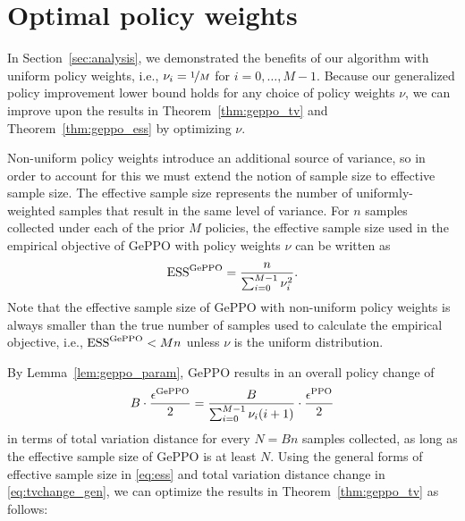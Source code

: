 \documentclass{article}
\begin{document}

\section{Optimal policy weights}\label{sec:app_weights}

In Section~\ref{sec:analysis}, we demonstrated the benefits of our algorithm with uniform policy weights, i.e., $\nu_i = \nicefrac{1}{M}$ for $i=0,\ldots,M-1$. Because our generalized policy improvement lower bound holds for any choice of policy weights $\nu$, we can improve upon the results in Theorem~\ref{thm:geppo_tv} and Theorem~\ref{thm:geppo_ess} by optimizing $\nu$.

Non-uniform policy weights introduce an additional source of variance, so in order to account for this we must extend the notion of sample size to effective sample size. The effective sample size represents the number of uniformly-weighted samples that result in the same level of variance. For $n$ samples collected under each of the prior $M$ policies, the effective sample size used in the empirical objective of GePPO with policy weights $\nu$ can be written as
\begin{equation}\label{eq:ess}
\operatorname{ESS}^\textnormal{GePPO} = \frac{n}{\sum_{i=0}^{M-1} \nu_i^2}.
\end{equation}
Note that the effective sample size of GePPO with non-uniform policy weights is always smaller than the true number of samples used to calculate the empirical objective, i.e., $\operatorname{ESS}^\textnormal{GePPO} < Mn$ unless $\nu$ is the uniform distribution.

By Lemma~\ref{lem:geppo_param}, GePPO results in an overall policy change of
\begin{equation}\label{eq:tvchange_gen}
B \cdot \frac{\epsilon^{\textnormal{GePPO}}}{2} = \frac{B}{\sum_{i=0}^{M-1} \nu_i(i+1)} \cdot \frac{\epsilon^{\textnormal{PPO}}}{2}
\end{equation}
in terms of total variation distance for every $N=Bn$ samples collected, as long as the effective sample size of GePPO is at least $N$. Using the general forms of effective sample size in \eqref{eq:ess} and total variation distance change in \eqref{eq:tvchange_gen}, we can optimize the results in Theorem~\ref{thm:geppo_tv} as follows:
\end{document}
